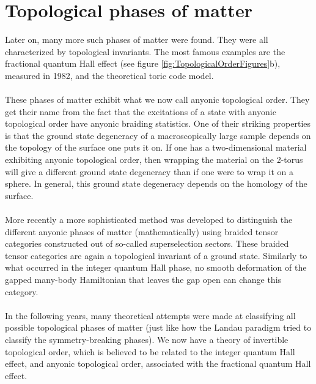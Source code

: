 \section{Topological phases of matter}
Later on, many more such phases of matter were found. They were all characterized by topological invariants. The most famous examples are the fractional quantum Hall effect (see figure \ref{fig:TopologicalOrderFigures}b), measured in 1982, and the theoretical toric code model.
\\\\
These phases of matter exhibit what we now call anyonic topological order. They get their name from the fact that the excitations of a state with anyonic topological order have anyonic braiding statistics. One of their striking properties is that the ground state degeneracy of a macroscopically large sample depends on the topology of the surface one puts it on. If one has a two-dimensional material exhibiting anyonic topological order, then wrapping the material on the 2-torus will give a different ground state degeneracy than if one were to wrap it on a sphere. In general, this ground state degeneracy depends on the homology of the surface.
\\\\
More recently a more sophisticated method was developed to distinguish the different anyonic phases of matter (mathematically) using braided tensor categories constructed out of so-called superselection sectors. These braided tensor categories are again a topological invariant of a ground state. Similarly to what occurred in the integer quantum Hall phase, no smooth deformation of the gapped many-body Hamiltonian that leaves the gap open can change this category.
\\\\
In the following years, many theoretical attempts were made at classifying all possible topological phases of matter (just like how the Landau paradigm tried to classify the symmetry-breaking phases). We now have a theory of invertible topological order, which is believed to be related to the integer quantum Hall effect, and anyonic topological order, associated with the fractional quantum Hall effect.
